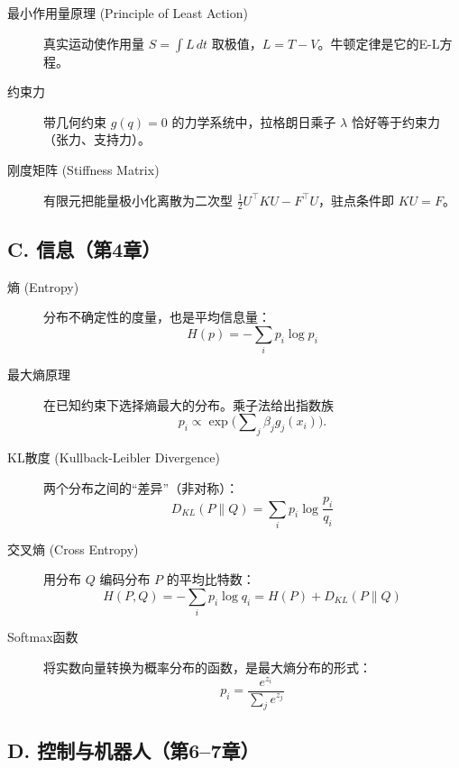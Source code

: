 \begin{description}
    \item[最小作用量原理 (Principle of Least Action)]
    真实运动使作用量 $S=\int L\,dt$ 取极值，$L=T-V$。牛顿定律是它的E-L方程。

    \item[约束力]
    带几何约束 $g(q)=0$ 的力学系统中，拉格朗日乘子 $\lambda$ 恰好等于约束力（张力、支持力）。

    \item[刚度矩阵 (Stiffness Matrix)]
    有限元把能量极小化离散为二次型 $\frac12 U^\top K U - F^\top U$，驻点条件即 $KU=F$。
\end{description}

\subsection*{C. 信息（第4章）}

\begin{description}
    \item[熵 (Entropy)]
    分布不确定性的度量，也是平均信息量：
    \[
    H(p) = -\sum_i p_i \log p_i
    \]

    \item[最大熵原理]
    在已知约束下选择熵最大的分布。乘子法给出指数族
    \[ p_i \propto \exp\Big(\sum\nolimits_j \beta_j g_j(x_i)\Big). \]

    \item[KL散度 (Kullback-Leibler Divergence)]
    两个分布之间的“差异”（非对称）：
    \[
    D_{KL}(P \| Q) = \sum_i p_i \log \frac{p_i}{q_i}
    \]

    \item[交叉熵 (Cross Entropy)]
    用分布 $Q$ 编码分布 $P$ 的平均比特数：
    \[
    H(P, Q) = -\sum_i p_i \log q_i = H(P) + D_{KL}(P \| Q)
    \]

    \item[Softmax函数]
    将实数向量转换为概率分布的函数，是最大熵分布的形式：
    \[
    p_i = \frac{e^{z_i}}{\sum_j e^{z_j}}
    \]
\end{description}

\subsection*{D. 控制与机器人（第6--7章）}

